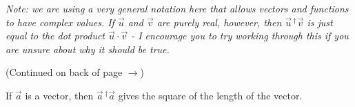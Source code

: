 \begin{questions}
		\emph{Note: we are using a very general notation here that allows vectors and functions to have complex values. If $\vec u$ and $\vec{v}$ are purely real, however, then $\vec u \,^\dag \vec v$ is just equal to the dot product $\vec u \cdot \vec v$ - I encourage you to try working through this if you are unsure about why it should be true.}
		
		\vspace{0.25in}
		\begin{flushright}(Continued on back of page $\rightarrow$)	\end{flushright}
		
		\newpage
		\question If $\vec a$ is a vector, then $\vec a\,^\dag \vec a$ gives the square of the length of the vector.
\end{questions}
